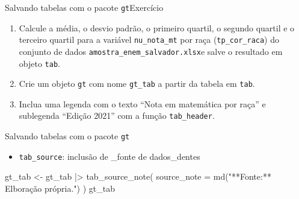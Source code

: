 \documentclass[
  10pt,
  ignorenonframetext,
]{beamer}
\newenvironment{Shaded}{\begin{snugshade}}{\end{snugshade}}
\newcommand{\AttributeTok}[1]{\textcolor[rgb]{0.40,0.45,0.13}{#1}}
\newcommand{\FunctionTok}[1]{\textcolor[rgb]{0.28,0.35,0.67}{#1}}
\newcommand{\NormalTok}[1]{\textcolor[rgb]{0.00,0.23,0.31}{#1}}
\newcommand{\OtherTok}[1]{\textcolor[rgb]{0.00,0.23,0.31}{#1}}
\newcommand{\SpecialCharTok}[1]{\textcolor[rgb]{0.37,0.37,0.37}{#1}}
\newcommand{\StringTok}[1]{\textcolor[rgb]{0.13,0.47,0.30}{#1}}
\providecommand{\tightlist}{%
  \setlength{\itemsep}{0pt}\setlength{\parskip}{0pt}}\usepackage{longtable,booktabs,array}
\begin{document}
\begin{frame}[fragile]{Salvando tabelas com o pacote
\texttt{gt}\newline Exercício}
\protect\hypertarget{salvando-tabelas-com-o-pacote-gtexercuxedcio}{}
\begin{enumerate}
\tightlist
\item
  Calcule a média, o desvio padrão, o primeiro quartil, o segundo
  quartil e o terceiro quartil para a variável \texttt{nu\_nota\_mt} por
  raça (\texttt{tp\_cor\_raca}) do conjunto de dados
  \texttt{amostra\_enem\_salvador.xlsx}e salve o resultado em objeto
  \texttt{tab}.
\item
  Crie um objeto \texttt{gt} com nome \texttt{gt\_tab} a partir da
  tabela em \texttt{tab}.
\item
  Inclua uma legenda com o texto ``Nota em matemática por raça'' e
  sublegenda ``Edição 2021'' com a função \texttt{tab\_header}.
\end{enumerate}
\end{frame}

\begin{frame}[fragile]{Salvando tabelas com o pacote \texttt{gt}}
\protect\hypertarget{salvando-tabelas-com-o-pacote-gt-3}{}
\begin{itemize}
\tightlist
\item
  \texttt{tab\_source}: inclusão de \_fonte de dados\_dentes
\end{itemize}

\begin{Shaded}
\begin{Highlighting}[]
\NormalTok{gt\_tab }\OtherTok{\textless{}{-}}\NormalTok{ gt\_tab }\SpecialCharTok{|\textgreater{}}
  \FunctionTok{tab\_source\_note}\NormalTok{(}
    \AttributeTok{source\_note =} \FunctionTok{md}\NormalTok{(}\StringTok{"**Fonte:** Elboração própria."}\NormalTok{)}
\NormalTok{  )}
\NormalTok{gt\_tab}
\end{Highlighting}
\end{Shaded}
\end{frame}
\end{document}
